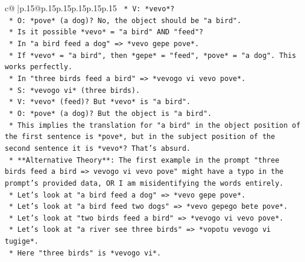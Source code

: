 \documentclass{article}
\begin{document}
{\begin{supertabular}{c@{$\;$}|p{.15\linewidth}@{}p{.15\linewidth}p{.15\linewidth}p{.15\linewidth}p{.15\linewidth}p{.15\linewidth}}
{{{\texttt{                                            *   V: *vevo*?} \\
\texttt{                                            *   O: *pove* (a dog)? No, the object should be "a bird".} \\
\texttt{                                            *   Is it possible *vevo* = "a bird" AND "feed"?} \\
\texttt{                                            *   In "a bird feed a dog" => *vevo gepe pove*.} \\
\texttt{                                                *   If *vevo* = "a bird", then *gepe* = "feed", *pove* = "a dog". This works perfectly.} \\
\texttt{                                            *   In "three birds feed a bird" => *vevogo vi vevo pove*.} \\
\texttt{                                                *   S: *vevogo vi* (three birds).} \\
\texttt{                                                *   V: *vevo* (feed)? But *vevo* is "a bird".} \\
\texttt{                                                *   O: *pove* (a dog)? But the object is "a bird".} \\
\texttt{                                                *   This implies the translation for "a bird" in the object position of the first sentence is *pove*, but in the subject position of the second sentence it is *vevo*? That's absurd.} \\
\texttt{                                                *   **Alternative Theory**: The first example in the prompt "three birds feed a bird => vevogo vi vevo pove" might have a typo in the prompt's provided data, OR I am misidentifying the words entirely.} \\
\texttt{                                                *   Let's look at "a bird feed a dog" => *vevo gepe pove*.} \\
\texttt{                                                *   Let's look at "a bird feed two dogs" => *vevo gepego bete pove*.} \\
\texttt{                                                *   Let's look at "two birds feed a bird" => *vevogo vi vevo pove*.} \\
\texttt{                                                *   Let's look at "a river see three birds" => *vopotu vevogo vi tugige*.} \\
\texttt{                                                    *   Here "three birds" is *vevogo vi*.} \\
}}}
\end{supertabular}}
\end{document}
